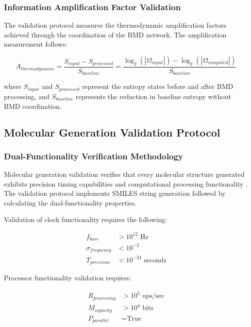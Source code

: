 \documentclass[12pt,a4paper]{article}
\begin{document}
\subsubsection{Information Amplification Factor Validation}

The validation protocol measures the thermodynamic amplification factors achieved through the coordination of the BMD network. The amplification measurement follows:

\begin{equation}
A_{thermodynamic} = \frac{S_{input} - S_{processed}}{S_{baseline}} = \frac{\log_2(|\Omega_{input}|) - \log_2(|\Omega_{computed}|)}{S_{baseline}}
\end{equation}

where $S_{input}$ and $S_{processed}$ represent the entropy states before and after BMD processing, and $S_{baseline}$ represents the reduction in baseline entropy without BMD coordination.

\subsection{Molecular Generation Validation Protocol}

\subsubsection{Dual-Functionality Verification Methodology}

Molecular generation validation verifies that every molecular structure generated exhibits precision timing capabilities and computational processing functionality \cite{lloyd2000ultimate}. The validation protocol implements SMILES string generation followed by calculating the dual-functionality properties.

Validation of clock functionality requires the following:

\begin{align}
f_{base} &> 10^{12} \text{ Hz} \\
\sigma_{frequency} &< 10^{-2} \\
T_{precision} &< 10^{-24} \text{ seconds}
\end{align}

Processor functionality validation requires:

\begin{align}
R_{processing} &> 10^{5} \text{ ops/sec} \\
M_{capacity} &> 10^{4} \text{ bits} \\
P_{parallel} &= \text{True}
\end{align}
\end{document}
